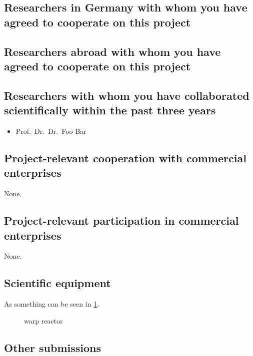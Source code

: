 \documentclass{scrartcl}
\begin{document}
\subsection{Researchers in Germany with whom you have agreed to cooperate on this project}

\subsection{Researchers abroad with whom you have agreed to cooperate on this project}

\subsection{Researchers with whom you have collaborated scientifically within the past three years}
\begin{itemize}
	\item Prof.\ Dr.\ Dr.\ Foo Bar
\end{itemize}

\subsection{Project-relevant cooperation with commercial enterprises}
None.

\subsection{Project-relevant participation in commercial enterprises}
None.

\subsection{Scientific equipment}
As something can be seen in \cref{fig:some_nice_graph}.

\begin{figure}
	\centering
	\caption{warp reactor}
	\label{fig:some_nice_graph}
\end{figure}

\subsection{Other submissions}
\end{document}

